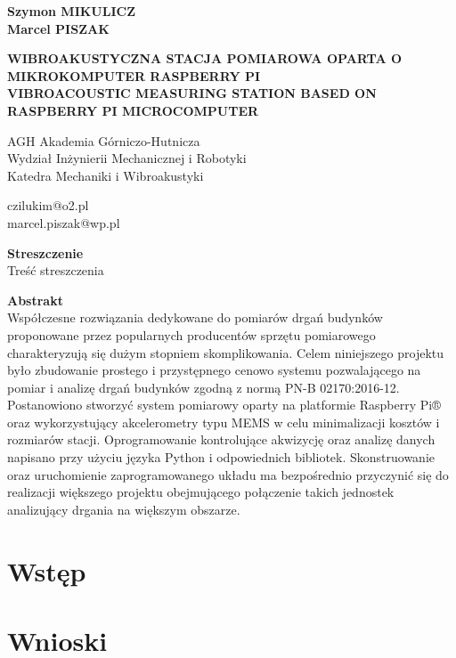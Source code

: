 \documentclass[a4paper,12pt]{mwart}
\begin{document}
\onehalfspacing
\begin{flushleft}

  \textbf{Szymon \MakeUppercase{Mikulicz}} \\
  \textbf{Marcel \MakeUppercase{Piszak}} \\
  \vspace*{12pt}

  \MakeUppercase{\textbf{Wibroakustyczna stacja pomiarowa oparta o mikrokomputer Raspberry Pi}} \\
  \vspace*{6pt}
  \MakeUppercase{\textbf{Vibroacoustic measuring station based on Raspberry Pi microcomputer}} \\
  \vspace*{12pt}

  AGH Akademia Górniczo-Hutnicza \\
  Wydział Inżynierii Mechanicznej i Robotyki \\
  Katedra Mechaniki i Wibroakustyki \\
  \vspace*{6pt}

  czilukim@o2.pl \\
  marcel.piszak@wp.pl \\

\end{flushleft}

\noindent
\textbf{Streszczenie} \\
Treść streszczenia
\vspace*{24pt}

\noindent
\textbf{Abstrakt} \\
Współczesne rozwiązania dedykowane do pomiarów drgań budynków
proponowane przez popularnych producentów sprzętu pomiarowego
charakteryzują się dużym stopniem skomplikowania. Celem niniejszego
projektu było zbudowanie prostego i przystępnego cenowo systemu
pozwalającego na pomiar i analizę drgań budynków zgodną z normą PN-B
02170:2016-12. Postanowiono stworzyć system pomiarowy oparty na
platformie Raspberry Pi® oraz wykorzystujący akcelerometry typu MEMS w
celu minimalizacji kosztów i rozmiarów stacji. Oprogramowanie
kontrolujące akwizycję oraz analizę danych napisano przy użyciu języka
Python i odpowiednich bibliotek. Skonstruowanie oraz uruchomienie
zaprogramowanego układu ma bezpośrednio przyczynić się do realizacji
większego projektu obejmującego połączenie takich jednostek analizujący
drgania na większym obszarze.
\vspace*{24pt}

\section{Wstęp}

\section{}

\section{Wnioski}
\end{document}
